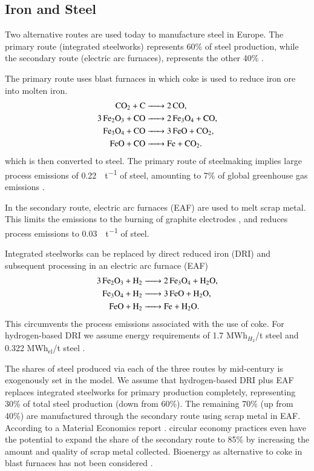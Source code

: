 \subsection{Iron and Steel}
\label{sec:si:industry:steel}

Two alternative routes are used today to manufacture steel in Europe. The
primary route (integrated steelworks) represents 60\% of steel production, while
the secondary route (electric arc furnaces), represents the other 40\%
.

The primary route uses blast furnaces in which coke is used to reduce iron ore
into molten iron.
\begin{align}
    \ce{CO2 + C &-> 2CO}, \\
    \ce{3Fe2O3 + CO &-> 2Fe3O4 + CO}, \\
    \ce{Fe3O4 + CO &-> 3FeO + CO2}, \\
    \ce{FeO + CO &-> Fe + CO2}.
\end{align}
which is then converted to steel. The primary route of steelmaking implies large
process emissions of \SI{0.22}{\tco\per\tonne} of steel, amounting to 7\% of
global greenhouse gas emissions .

In the secondary route, electric arc furnaces (EAF) are used to melt scrap
metal. This limits the \co emissions to the burning of graphite electrodes
, and reduces process emissions to
\SI{0.03}{\tco\per\tonne} of steel.

Integrated steelworks can be replaced by direct reduced iron (DRI) and subsequent processing in an electric arc furnace (EAF)
\begin{align}
    \ce{3Fe2O3 + H2 &-> 2Fe3O4 + H2O}, \\
    \ce{Fe3O4 + H2 &-> 3FeO + H2O}, \\
    \ce{FeO + H2 &-> Fe + H2O}.
\end{align}
This circumvents the process emissions associated with the use of coke. For
hydrogen-based DRI we assume energy requirements of 1.7 MWh$_{H_2}$/t steel
 and 0.322 MWh$_{\text{el}}$/t steel
.

The shares of steel produced via each of the three routes by mid-century is exogenously
set in the model. We assume that hydrogen-based DRI plus EAF replaces integrated
steelworks for primary production completely, representing 30\% of total steel
production (down from 60\%). The remaining 70\% (up from 40\%) are manufactured
through the secondary route using scrap metal in EAF. According to
a Material Economics report . circular economy practices even have the potential to
expand the share of the secondary route to 85\% by increasing the amount and
quality of scrap metal collected. Bioenergy as alternative to coke in blast
furnaces has not been considered .

